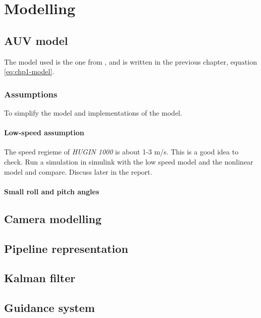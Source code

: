 \chapter{Modelling}


\section{AUV model}
	The model used is the one from \cite{fossen}, and is written in the previous chapter, equation \eqref{eq:chp1-model}.
	
	\subsection{Assumptions}
	To simplify the model and implementations of the model. 
		\subsubsection{Low-speed assumption}
		The speed regieme of \textit{HUGIN 1000} is about 1-3 m/s. This is a good idea to check. Run a simulation in simulink with the low speed model and the nonlinear model and compare. Discuss later in the report.

		\subsubsection{Small roll and pitch angles}


\section{Camera modelling}
	
	


\section{Pipeline representation}


\section{Kalman filter}



\section{Guidance system}